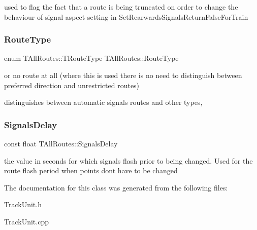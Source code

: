 used to flag the fact that a route is being truncated on order to change the behaviour of signal aspect setting in Set\+Rearwards\+Signals\+Return\+False\+For\+Train \mbox{\label{class_t_all_routes_a418f6235db60f6f41c56aede07b5fe24}} 
\subsubsection{\texorpdfstring{Route\+Type}{RouteType}}
{\footnotesize\ttfamily enum T\+All\+Routes\+::\+T\+Route\+Type  T\+All\+Routes\+::\+Route\+Type}



or no route at all (where this is used there is no need to distinguish between preferred direction and unrestricted routes) 

distinguishes between automatic signals routes and other types, \mbox{\label{class_t_all_routes_a7183b12f8de4fcb82e036252a37d574d}} 
\subsubsection{\texorpdfstring{Signals\+Delay}{SignalsDelay}}
{\footnotesize\ttfamily const float T\+All\+Routes\+::\+Signals\+Delay}

the value in seconds for which signals flash prior to being changed. Used for the route flash period when points don\textquotesingle{}t have to be changed 

The documentation for this class was generated from the following files\+:\begin{DoxyCompactItemize}
\item 
Track\+Unit.\+h\item 
Track\+Unit.\+cpp\end{DoxyCompactItemize}

